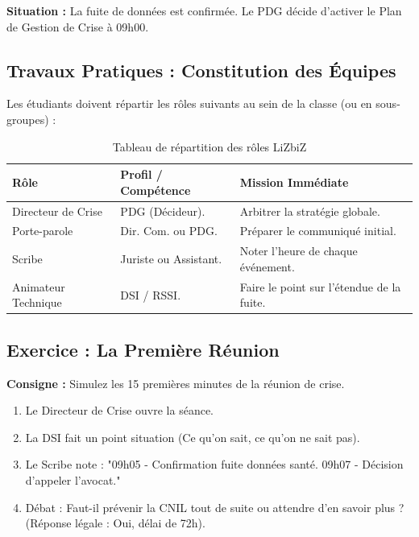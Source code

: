 \begin{boxlizbiz}
\textbf{Situation :} La fuite de données est confirmée. Le PDG décide d'activer le Plan de Gestion de Crise à 09h00.
\end{boxlizbiz}

\subsection{Travaux Pratiques : Constitution des Équipes}

Les étudiants doivent répartir les rôles suivants au sein de la classe (ou en sous-groupes) :

\begin{table}[htbp]
\centering
\begin{tabular}{p{3cm}p{5cm}p{4cm}}
    \toprule
    \textbf{Rôle} & \textbf{Profil / Compétence} & \textbf{Mission Immédiate} \\
    \midrule
    Directeur de Crise & PDG (Décideur). & Arbitrer la stratégie globale. \\
    Porte-parole & Dir. Com. ou PDG. & Préparer le communiqué initial. \\
    Scribe & Juriste ou Assistant. & Noter l'heure de chaque événement. \\
    Animateur Technique & DSI / RSSI. & Faire le point sur l'étendue de la fuite. \\
    \bottomrule
\end{tabular}
\caption{Tableau de répartition des rôles LiZbiZ}
\end{table}

\subsection{Exercice : La Première Réunion}

\textbf{Consigne :} Simulez les 15 premières minutes de la réunion de crise.

\begin{enumerate}
    \item Le Directeur de Crise ouvre la séance.
    \item La DSI fait un point situation (Ce qu'on sait, ce qu'on ne sait pas).
    \item Le Scribe note : "09h05 - Confirmation fuite données santé. 09h07 - Décision d'appeler l'avocat."
    \item Débat : Faut-il prévenir la CNIL tout de suite ou attendre d'en savoir plus ? (Réponse légale : Oui, délai de 72h).
\end{enumerate}

